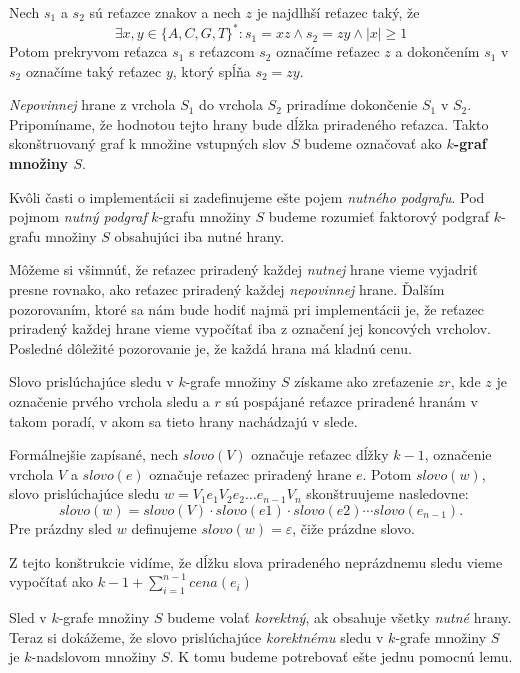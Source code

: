 \begin{defn}
Nech $s_1$ a $s_2$ sú reťazce znakov a nech $z$ je najdlhší reťazec taký, že
$$\exists x, y \in \{A, C, G, T\}^*: s_1 = xz \wedge s_2 = zy \wedge |x| \ge 1 $$
Potom prekryvom reťazca $s_1$ s reťazcom $s_2$ označíme reťazec $z$ a dokončením $s_1$ v $s_2$ označíme
taký reťazec $y$, ktorý spĺňa $s_2 = zy$.
\end{defn}

\emph{Nepovinnej} hrane z vrchola $S_1$ do vrchola $S_2$ priradíme dokončenie $S_1$ v
$S_2$. Pripomíname, že hodnotou tejto hrany bude dĺžka priradeného reťazca.
Takto skonštruovaný graf k množine vstupných slov $S$ budeme označovať ako
\textbf{\boldmath$k$-graf množiny \boldmath$S$}.

Kvôli časti o implementácii si zadefinujeme ešte pojem \emph{nutného podgrafu}.
Pod pojmom \emph{nutný podgraf} $k$-grafu množiny $S$ budeme rozumieť faktorový
podgraf $k$-grafu množiny $S$ obsahujúci iba nutné hrany.

Môžeme si všimnúť, že reťazec priradený každej \emph{nutnej} hrane vieme vyjadriť
presne rovnako, ako reťazec priradený každej \emph{nepovinnej} hrane. Ďalším pozorovaním,
ktoré sa nám bude hodiť najmä pri implementácii je, že reťazec priradený každej
hrane vieme vypočítať iba z označení jej koncových vrcholov. Posledné dôležité
pozorovanie je, že každá hrana má kladnú cenu.

Slovo prislúchajúce sledu v $k$-grafe množiny $S$ získame ako zreťazenie $zr$, kde $z$ je
označenie prvého vrchola sledu a $r$ sú pospájané reťazce priradené hranám v takom
poradí, v akom sa tieto hrany nachádzajú v slede.

Formálnejšie zapísané, nech $slovo(V)$ označuje reťazec dĺžky $k-1$, označenie vrchola
$V$ a $slovo(e)$ označuje reťazec priradený hrane $e$. Potom $slovo(w)$, slovo
prislúchajúce sledu $w = V_1 e_1 V_2 e_2 \ldots e_{n-1} V_n$ skonštruujeme nasledovne: 
$$slovo(w) = slovo(V) \cdot slovo(e1) \cdot slovo(e2) \cdots slovo(e_{n-1}).$$
Pre prázdny sled $w$ definujeme $slovo(w) = \varepsilon$, čiže prázdne slovo.

Z tejto konštrukcie vidíme, že dĺžku slova priradeného neprázdnemu sledu vieme
vypočítať ako $k-1 + \sum \limits_{i=1}^{n-1} cena(e_i)$

Sled v $k$-grafe množiny $S$ budeme volať \emph{korektný}, ak obsahuje všetky \emph{nutné} hrany.
Teraz si dokážeme, že slovo prislúchajúce \emph{korektnému} sledu v $k$-grafe množiny $S$ je
$k$-nadslovom množiny $S$. K tomu budeme potrebovať ešte jednu pomocnú lemu.

